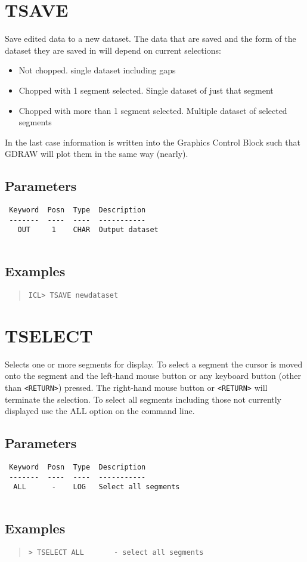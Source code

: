 \documentclass{book}
\renewcommand{\_}{{\tt\char'137}}     %
\begin{document}
\section{TSAVE}
Save edited data to a new dataset. The data that are saved
and the form of the dataset they are saved in will depend on
current selections:
 
\begin{itemize}
\item Not chopped. single dataset including gaps
\item Chopped with 1 segment selected. Single dataset of just that segment
\item Chopped with more than 1 segment selected. Multiple dataset of
selected segments
\end{itemize}
In the last case information is written into the Graphics
Control Block such that GDRAW will plot them in the same
way (nearly).
 
\subsection{Parameters}
\begin{verbatim}
 Keyword  Posn  Type  Description
 -------  ----  ----  -----------
   OUT     1    CHAR  Output dataset
 
\end{verbatim}\subsection{Examples}
\begin{quote}\begin{verbatim}
ICL> TSAVE newdataset
\end{verbatim}\end{quote}
\section{TSELECT}
Selects one or more segments for display. To select a segment
the cursor is moved onto the segment and the left-hand mouse
button or any keyboard button (other than \verb+<RETURN>+) pressed.
The right-hand mouse button or \verb+<RETURN>+ will terminate the
selection. To select all segments including those not currently
displayed use the ALL option on the command line.
 
\subsection{Parameters}
\begin{verbatim}
 Keyword  Posn  Type  Description
 -------  ----  ----  -----------
  ALL      -    LOG   Select all segments
 
\end{verbatim}\subsection{Examples}
\begin{quote}\begin{verbatim}
> TSELECT ALL       - select all segments
\end{verbatim}\end{quote}
\end{document}
